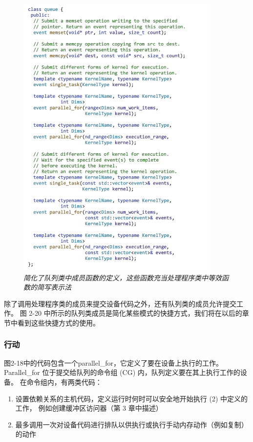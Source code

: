 \begin{figure}[H]
	\centering
	\includegraphics[width=0.9\textwidth]{figs/F2.20.png}
	\caption{\textit{简化了队列类中成员函数的定义，这些函数充当处理程序类中等效函数的简写表示法}}
\end{figure}

除了调用处理程序类的成员来提交设备代码之外，还有队列类的成员允许提交工作。 
图 2-20 中所示的队列类成员是简化某些模式的快捷方式，我们将在以后的章节中看到这些快捷方式的使用。

\subsubsection{行动}
图2-18中的代码包含一个parallel\_for，它定义了要在设备上执行的工作。 
Parallel\_for 位于提交给队列的命令组 (CG) 内，队列定义要在其上执行工作的设备。 在命令组内，有两类代码：

\begin{enumerate}
	\item 设置依赖关系的主机代码，定义运行时何时可以安全地开始执行 (2) 中定义的工作，
	例如创建缓冲区访问器（第 3 章中描述）

	\item 最多调用一次对设备代码进行排队以供执行或执行手动内存动作（例如复制）的动作
\end{enumerate}

